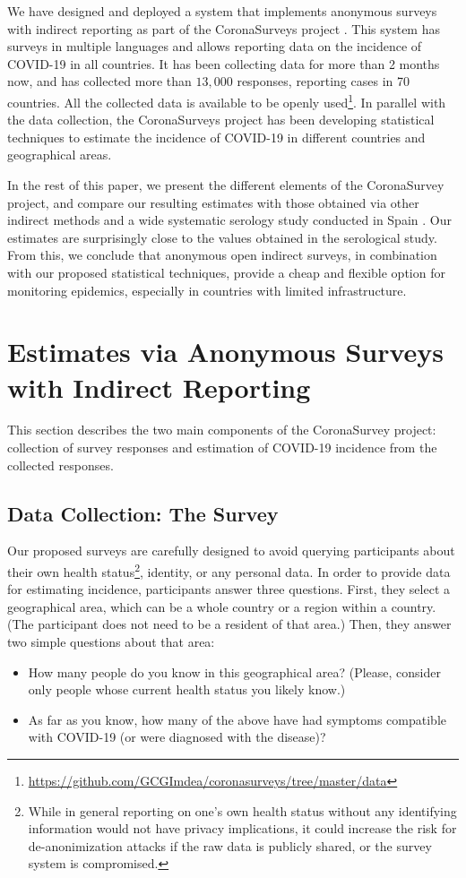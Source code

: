\documentclass[sigconf,authordraft]{acmart}
\begin{document}
We have designed and deployed a system that implements anonymous surveys with indirect reporting  as part of the CoronaSurveys project \cite{CoronaSurveys}. This system has surveys in multiple languages and allows reporting data on the incidence of COVID-19 in all countries. It has been collecting data for more than 2 months now, and has collected more than $13,000$ responses, reporting cases in 70 countries. All the collected data is available to be openly used\footnote{\url{https://github.com/GCGImdea/coronasurveys/tree/master/data}}. In parallel with the data collection, the CoronaSurveys project has been developing statistical techniques to estimate the incidence of COVID-19 in different countries and geographical areas.

In the rest of this paper, we present the different elements of the CoronaSurvey project, and compare our resulting estimates with those obtained via other indirect methods and a wide systematic serology study conducted in Spain \cite{ENEcovid19}. Our estimates are surprisingly close to the values obtained in the serological study. From this, we conclude that  
anonymous open indirect surveys, in combination with our proposed statistical techniques, provide a cheap and flexible option for monitoring
epidemics, especially in countries with limited infrastructure.

\section{Estimates via Anonymous Surveys with Indirect Reporting}

This section describes the two main components of the CoronaSurvey project: collection of survey responses and estimation of COVID-19 incidence from the collected responses.

\subsection{Data Collection: The Survey}

Our proposed surveys are carefully designed to avoid querying participants about their own health status\footnote{While in general reporting on one's own health status without any identifying information would not have privacy implications, it could increase the risk for de-anonimization attacks if the raw data is publicly shared, or the survey system is compromised.}, identity, or any personal data. In order to provide data for estimating incidence, participants answer three questions. First, they select a geographical area, which can be a whole country or a region within a country. (The participant does not need to be a resident of that area.)  Then, they answer two simple questions about that area: 
\begin{itemize}
\item How many people do you know in this geographical area? (Please, consider only people whose current health status you likely know.)
\item As far as you know, how many of the above have had symptoms compatible with COVID-19 (or were diagnosed with the disease)?
\end{itemize}
\end{document}
